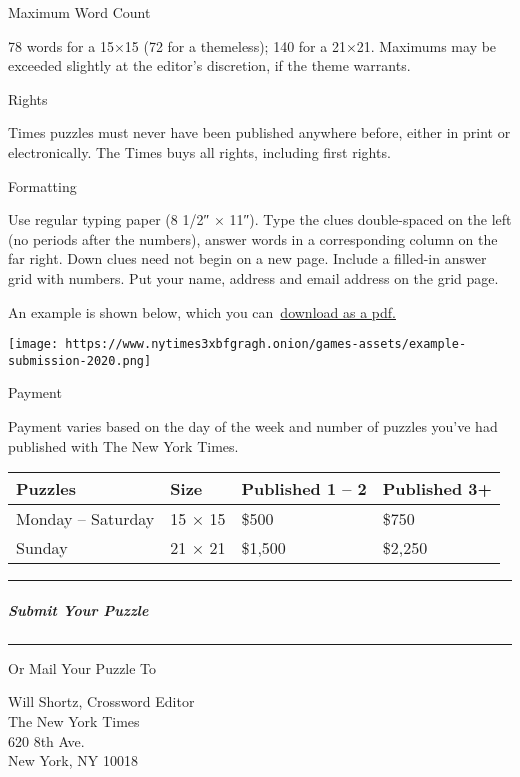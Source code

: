 Maximum Word Count

78 words for a 15×15 (72 for a themeless); 140 for a 21×21. Maximums may
be exceeded slightly at the editor's discretion, if the theme warrants.

Rights

Times puzzles must never have been published anywhere before, either in
print or electronically. The Times buys all rights, including first
rights.

Formatting

Use regular typing paper (8 1/2″ × 11″). Type the clues double-spaced on
the left (no periods after the numbers), answer words in a corresponding
column on the far right. Down clues need not begin on a new page.
Include a filled-in answer grid with numbers. Put your name, address and
email address on the grid page.

An example is shown below, which you
can~\href{https://static01.graylady3jvrrxbe.onion/packages/other/crossword/puzzle-media/shared/Sample-Submission-2020.pdf}{download
as a pdf.}

\texttt{[image: https://www.nytimes3xbfgragh.onion/games-assets/example-submission-2020.png]}

Payment

Payment varies based on the day of the week and number of puzzles you've
had published with The New York Times.

\begin{longtable}[]{@{}llll@{}}
\toprule
Puzzles & Size & Published 1 -- 2 & Published 3+\tabularnewline
\midrule
\endhead
Monday -- Saturday & 15 × 15 & \$500 & \$750\tabularnewline
Sunday & 21 × 21 & \$1,500 & \$2,250\tabularnewline
\bottomrule
\end{longtable}

\begin{center}\rule{0.5\linewidth}{\linethickness}\end{center}

\hypertarget{submit-your-puzzle}{%
\subparagraph{Submit Your Puzzle}\label{submit-your-puzzle}}

\begin{center}\rule{0.5\linewidth}{\linethickness}\end{center}

Or Mail Your Puzzle To

Will Shortz, Crossword Editor\\
The New York Times\\
620 8th Ave.\\
New York, NY 10018


